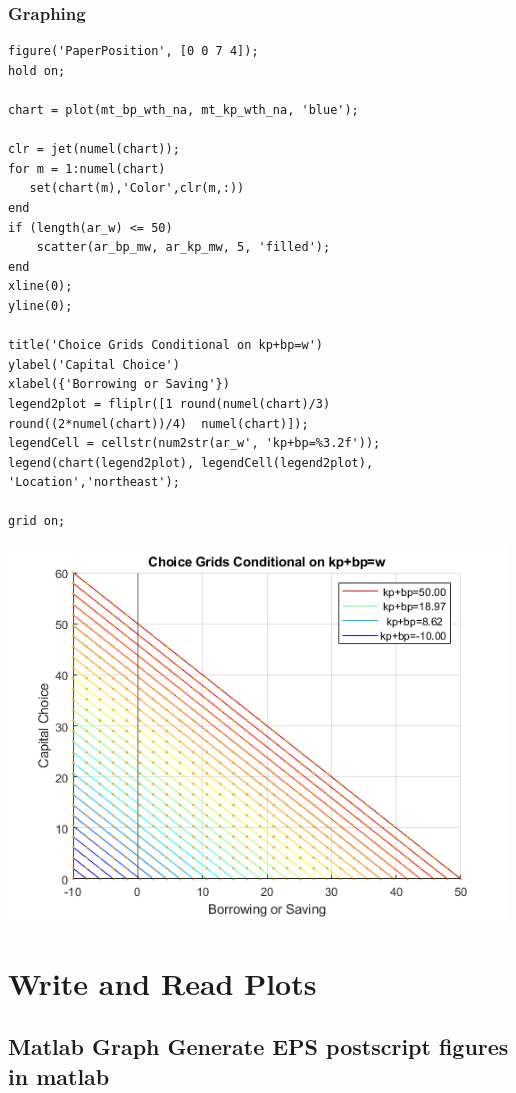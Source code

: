 \documentclass[
]{book}
\begin{document}
\hypertarget{graphing}{%
\subsubsection{Graphing}\label{graphing}}

\begin{verbatim}
figure('PaperPosition', [0 0 7 4]);
hold on;

chart = plot(mt_bp_wth_na, mt_kp_wth_na, 'blue');

clr = jet(numel(chart));
for m = 1:numel(chart)
   set(chart(m),'Color',clr(m,:))
end
if (length(ar_w) <= 50) 
    scatter(ar_bp_mw, ar_kp_mw, 5, 'filled');
end
xline(0);
yline(0);

title('Choice Grids Conditional on kp+bp=w')
ylabel('Capital Choice')
xlabel({'Borrowing or Saving'})
legend2plot = fliplr([1 round(numel(chart)/3) round((2*numel(chart))/4)  numel(chart)]);
legendCell = cellstr(num2str(ar_w', 'kp+bp=%3.2f'));
legend(chart(legend2plot), legendCell(legend2plot), 'Location','northeast');

grid on;
\end{verbatim}

\includegraphics[width=5.20833in,height=\textheight]{img/fs_specline_images/figure_0.png}

\hypertarget{write-and-read-plots}{%
\section{Write and Read Plots}\label{write-and-read-plots}}

\hypertarget{matlab-graph-generate-eps-postscript-figures-in-matlab}{%
\subsection{Matlab Graph Generate EPS postscript figures in matlab}\label{matlab-graph-generate-eps-postscript-figures-in-matlab}}
\end{document}

